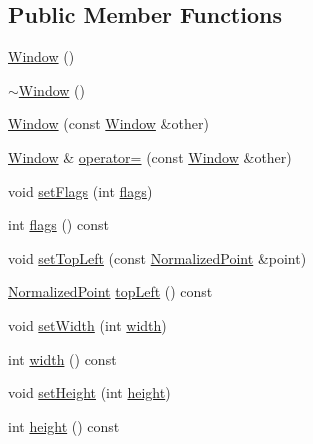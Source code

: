 \subsection*{Public Member Functions}
\begin{DoxyCompactItemize}
\item 
\hyperlink{classOkular_1_1Annotation_1_1Window_a921b3505d40ee03108428c30495b85bd}{Window} ()
\item 
\hyperlink{classOkular_1_1Annotation_1_1Window_a75ad38e68b05be37d6a7583c78384383}{$\sim$\+Window} ()
\item 
\hyperlink{classOkular_1_1Annotation_1_1Window_af4a5478f63040dfe9eb04d783457834b}{Window} (const \hyperlink{classOkular_1_1Annotation_1_1Window}{Window} \&other)
\item 
\hyperlink{classOkular_1_1Annotation_1_1Window}{Window} \& \hyperlink{classOkular_1_1Annotation_1_1Window_ae215f456ad84f2848743e78cb84b51ef}{operator=} (const \hyperlink{classOkular_1_1Annotation_1_1Window}{Window} \&other)
\item 
void \hyperlink{classOkular_1_1Annotation_1_1Window_a8c6602458c602f7cd00ba29255524682}{set\+Flags} (int \hyperlink{classOkular_1_1Annotation_1_1Window_a152ba6007570ecd2d7693e98457a2cda}{flags})
\item 
int \hyperlink{classOkular_1_1Annotation_1_1Window_a152ba6007570ecd2d7693e98457a2cda}{flags} () const 
\item 
void \hyperlink{classOkular_1_1Annotation_1_1Window_ac61b3d3fdf669cdc2dfe4bed466557b0}{set\+Top\+Left} (const \hyperlink{classOkular_1_1NormalizedPoint}{Normalized\+Point} \&point)
\item 
\hyperlink{classOkular_1_1NormalizedPoint}{Normalized\+Point} \hyperlink{classOkular_1_1Annotation_1_1Window_ab89d3b8dbcd8e0cacf2b66e6dd3c415f}{top\+Left} () const 
\item 
void \hyperlink{classOkular_1_1Annotation_1_1Window_ad3f64fb2195e55153d5210cfcfb2748e}{set\+Width} (int \hyperlink{classOkular_1_1Annotation_1_1Window_ae08915fbeec4ec8fdb3393b0c6361222}{width})
\item 
int \hyperlink{classOkular_1_1Annotation_1_1Window_ae08915fbeec4ec8fdb3393b0c6361222}{width} () const 
\item 
void \hyperlink{classOkular_1_1Annotation_1_1Window_a806d2512feb2b574c2719a344e4eff4b}{set\+Height} (int \hyperlink{classOkular_1_1Annotation_1_1Window_aa5ff598721f33675de9ddc7f4c041347}{height})
\item 
int \hyperlink{classOkular_1_1Annotation_1_1Window_aa5ff598721f33675de9ddc7f4c041347}{height} () const 

\end{DoxyCompactItemize}
